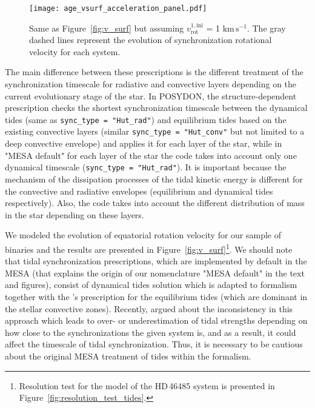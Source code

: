 \documentclass{aa}
\newcommand{\kms}{$\mathrm{km\,s^{-1}}$}
\DeclareRobustCommand{\Figref}[1]{Figure~\ref{#1}}
\begin{document}
\begin{figure}[!ht]
  \centering
  \texttt{[image: age\_vsurf\_acceleration\_panel.pdf]}
  \caption{Same as \Figref{fig:v_surf} but assuming $v_\mathrm{rot}^\mathrm{1,ini}$ = 1 \kms. The gray dashed lines represent the evolution of synchronization rotational velocity for each system.}
  \label{fig:v_surf_acceleration}
\end{figure}



The main difference between these prescriptions is the different treatment of the synchronization timescale for radiative and convective layers depending on the
current evolutionary stage of the star.
 In POSYDON, the structure-dependent prescription checks the shortest synchronization timescale between the dynamical tides (same as \texttt{sync\_type = "Hut\_rad"}) and equilibrium tides based on the existing convective layers (similar \texttt{sync\_type = "Hut\_conv"} but not limited to a deep convective envelope) and applies it for each layer of the star, while in "MESA default" for each layer of the star the code takes into account only one dynamical timescale (\texttt{sync\_type = "Hut\_rad"}).
It is important because the mechanism of the dissipation processes of the tidal kinetic energy is different for the convective and radiative envelopes (equilibrium and dynamical tides respectively).
 Also, the code takes into account the different distribution of mass in the star depending on these
layers.

We modeled the evolution of equatorial rotation velocity for
our sample of binaries and the results are presented in \Figref{fig:v_surf}\footnote{Resolution test for the model of the HD\,46485 system is presented in \Figref{fig:resolution_test_tides}.}.
We should note that \citet{Hurley_2002} tidal synchronization prescriptions, which are implemented by default in the MESA (that explains the origin of our nomenclature "MESA default" in the text and figures), consist of \citet{Zahn_1977} dynamical tides solution which is adapted to \citet{Hut_1981} formalism together with the \citeauthor{Hut_1981}'s prescription for the equilibrium tides (which are dominant in the stellar convective zones).
Recently, \citet{Sciarini_2024} argued about the inconsistency in this approach which leads to over- or underestimation of tidal strengths depending on how close to the synchronizations the given system is, and as a result, it could affect the timescale of tidal synchronization.
Thus, it is necessary to be cautious about the original MESA treatment of tides within the \citeauthor{Hurley_2002} formalism.
\end{document}
